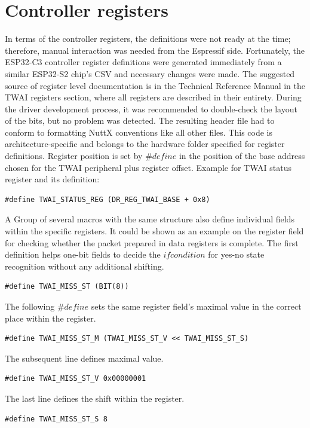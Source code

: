 \documentclass{ctuthesis}
\begin{document}
 \section{Controller registers}
 In terms of the controller registers, the definitions were not ready at the time; therefore, manual interaction was needed from the Espressif side. Fortunately, the ESP32-C3 controller register definitions were generated immediately from a similar ESP32-S2 chip's CSV and necessary changes were made. The suggested source of register level documentation is in the Technical Reference Manual in the TWAI registers section, where all registers are described in their entirety. During the driver development process, it was recommended to double-check the layout of the bits, but no problem was detected. The resulting header file had to conform to formatting NuttX conventions like all other files. This code is architecture-specific and belongs to the hardware folder specified for register definitions. Register position is set by $\#define$ in the position of the base address chosen for the TWAI peripheral plus register offset. Example for TWAI status register and its definition:
\begin{verbatim}
#define TWAI_STATUS_REG (DR_REG_TWAI_BASE + 0x8)
\end{verbatim}
 A Group of several macros with the same structure also define individual fields within the specific registers. It could be shown as an example on the register field for checking whether the packet prepared in data registers is complete. The first definition helps one-bit fields to decide the $if condition$ for yes-no state recognition without any additional shifting.
\begin{verbatim}
#define TWAI_MISS_ST (BIT(8))
\end{verbatim}
 The following $\#define$ sets the same register field's maximal value in the correct place within the register.
\begin{verbatim}
#define TWAI_MISS_ST_M (TWAI_MISS_ST_V << TWAI_MISS_ST_S)
\end{verbatim}
 The subsequent line defines maximal value.
\begin{verbatim}
#define TWAI_MISS_ST_V 0x00000001
\end{verbatim}
 The last  line defines the shift within the register.
\begin{verbatim}
#define TWAI_MISS_ST_S 8
\end{verbatim}
\end{document}
